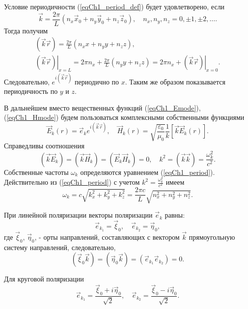 Условие периодичности (\ref{eqCh1_period_def}) будет удовлетворено,
если 
\begin{equation}
\vec{k} = \frac{2 \pi}{L}\left(n_x \vec{x}_0
+ n_y \vec{y}_0
+ n_z \vec{z}_0
\right),
\quad
n_x, n_y, n_z = 0, \pm 1, \pm 2, \dots .
\label{eqCh1_period}
\end{equation}
Тогда получим
\begin{eqnarray}
\left(\vec{k}\vec{r}\right) = \frac{2 \pi}{L}\left(n_x x
+ n_y y
+ n_z z
\right),
\nonumber \\
\left.\left(\vec{k}\vec{r}\right)\right|_{x = L} = 2 \pi n_x + \frac{2 \pi}{L}\left(n_y y
+ n_z z
\right) = 
2 \pi n_x + \left.\left(\vec{k}\vec{r}\right)\right|_{x = 0}.
\end{eqnarray}
Следовательно,    
$e^{i\left(\vec{k}\vec{r}\right)}$
периодично по $x$.  Таким же образом показывается
периодичность по  $y$  и  $z$.
 
В дальнейшем вместо вещественных функций (\ref{eqCh1_Emode}), 
(\ref{eqCh1_Hmode}) будем пользоваться
комплексными собственными функциями 
\begin{equation}
\vec{E}_k\left(r\right) = \vec{e}_k e^{i \left( \vec{k}\vec{r}\right)},
\quad
\vec{H}_k\left(r\right) = \sqrt{\frac{\varepsilon_0}{\mu_0}}\frac{1}{k}
\left[\vec{k}\vec{E}_k\left(r\right)\right].
\label{eqCh1_EHmode}
\end{equation}
Справедливы соотношения
\[
\left(\vec{k}\vec{E}_k\right) = 
\left(\vec{k}\vec{H}_k\right) = 
\left(\vec{E}_k\vec{H}_k\right) = 0,
\quad
k^2 = \left(\vec{k}\vec{k}\right) = 
\frac{\omega_k^2}{c^2}.
\]
Собственные частоты $\omega_k$ определяются уравнением
(\ref{eqCh1_period}). Действительно из (\ref{eqCh1_period}) с учетом
$k^2 = \frac{\omega_k^2}{c^2}$ имеем 
\begin{equation}
\omega_k = c \sqrt{k_x^2 + k_y^2 + k_z^2} = 
\frac{2 \pi c}{L} \sqrt{n_x^2 + n_y^2 + n_z^2}.
\end{equation}

При линейной поляризации векторы поляризации $\vec{e}_k$ равны:
\[
\vec{e}_{k_1} = \vec{\xi}_0,
\quad
\vec{e}_{k_2} = \vec{\eta}_0,
\]
где $\vec{\xi}_0$, $\vec{\eta}_0$, - орты направлений, составляющих с
вектором $\vec{k}$ прямоугольную систему направлений, следовательно, 
\[
\left(\vec{\xi}_0\vec{k}\right) =
\left(\vec{\eta}_0\vec{k}\right) =
\left(\vec{e}_{k_1}\vec{e}_{k_2}\right) = 0.
\]

Для круговой поляризации
\[
\vec{e}_{k_1} = \frac{\vec{\xi}_0 + i \vec{\eta}_0}{\sqrt{2}},
\quad
\vec{e}_{k_2} = \frac{\vec{\xi}_0 - i \vec{\eta}_0}{\sqrt{2}}.
\]


